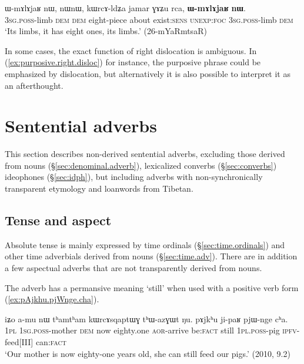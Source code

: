 \begin{exe}
\ex \label{ex:WmAlAjaR2}
\gll ɯ-mɤlɤjaʁ nɯ, nɯnɯ, kɯrcɤ-ldʑa jamar ɣɤʑu rca, \textbf{ɯ-mɤlɤjaʁ} \textbf{nɯ}. \\
\textsc{3sg}.\textsc{poss}-limb \textsc{dem} \textsc{dem} eight-piece about exist:\textsc{sens} \textsc{unexp}:\textsc{foc} \textsc{3sg}.\textsc{poss}-limb \textsc{dem}  \\
\glt `Its limbs, it has eight ones, its limbs.' (26-mYaRmtsaR)
\end{exe}

In some cases, the exact function of right dislocation is ambiguous. In (\ref{ex:purposive.right.disloc}) for instance, the purposive phrase could be emphasized by dislocation, but alternatively it is also possible to interpret it as an afterthought.

\section{Sentential adverbs} \label{sec:sentential.adverbs}
This section describes non-derived sentential adverbs, excluding those derived from nouns (§\ref{sec:denominal.adverb}), lexicalized converbs (§\ref{sec:converbs})  ideophones (§\ref{sec:idph}), but including adverbs with non-synchronically transparent etymology and loanwords from Tibetan.
 
\subsection{Tense and aspect} \label{sec:tense.aspect.adverbs}
Absolute tense is mainly expressed by time ordinals (§\ref{sec:time.ordinals}) and other time adverbials derived from nouns (§\ref{sec:time.adv}). There are in addition a few aspectual adverbs that are not transparently derived from nouns.

The adverb  has a permansive meaning `still' when used with a positive verb form (\ref{ex:pAjkhu.pjWnge.cha}).

\begin{exe}
\ex \label{ex:pAjkhu.pjWnge.cha}
\gll iʑo a-mu nɯ tʰamtʰam kɯrcɤsqaptɯɣ tʰɯ-azɣɯt ŋu. pɤjkʰu ji-paʁ pjɯ-nge cʰa. \\
\textsc{1pl} \textsc{1sg}.\textsc{poss}-mother \textsc{dem} now eighty.one \textsc{aor}-arrive be:\textsc{fact} still \textsc{1pl}.\textsc{poss}-pig \textsc{ipfv}-feed[III] can:\textsc{fact} \\
 \glt `Our mother is now eighty-one years old, she can still feed our pigs.' (2010, 9.2)
 \end{exe}
 
